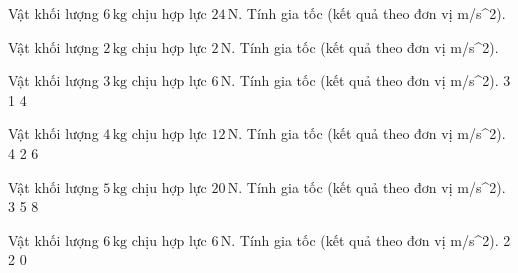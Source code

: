 \begin{bt}
Vật khối lượng $6\,\text{kg}$ chịu hợp lực $24\,\text{N}$. Tính gia tốc (kết quả theo đơn vị m/s^2).
\end{bt}

\begin{bt}
Vật khối lượng $2\,\text{kg}$ chịu hợp lực $2\,\text{N}$. Tính gia tốc (kết quả theo đơn vị m/s^2).
\end{bt}

\begin{ex}
Vật khối lượng $3\,\text{kg}$ chịu hợp lực $6\,\text{N}$. Tính gia tốc (kết quả theo đơn vị m/s^2).
\choice
{}
{3}
{1}
{4}
\end{ex}

\begin{ex}
Vật khối lượng $4\,\text{kg}$ chịu hợp lực $12\,\text{N}$. Tính gia tốc (kết quả theo đơn vị m/s^2).
\choice
{4}
{}
{2}
{6}
\end{ex}

\begin{ex}
Vật khối lượng $5\,\text{kg}$ chịu hợp lực $20\,\text{N}$. Tính gia tốc (kết quả theo đơn vị m/s^2).
\choice
{3}
{5}
{}
{8}
\end{ex}

\begin{ex}
Vật khối lượng $6\,\text{kg}$ chịu hợp lực $6\,\text{N}$. Tính gia tốc (kết quả theo đơn vị m/s^2).
\choice
{2}
{2}
{0}
{}
\end{ex}

